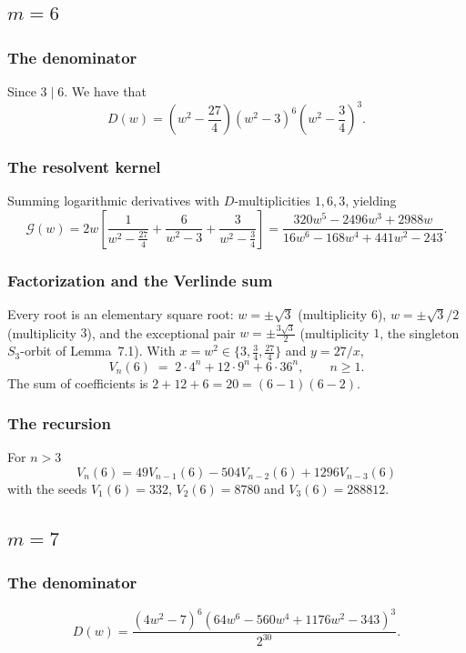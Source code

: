 \documentclass[11pt,reqno]{amsart}
\theoremstyle{remark}
\begin{document}
\subsection*{$m=6$}

\subsubsection*{The denominator}
Since $3\mid6$.  We have that
\[
D(w) = \left(w^2-\frac{27}{4}\right)(w^2-3)^6\left(w^2-\frac34\right)^{\!3}.
\]

\subsubsection*{The resolvent kernel}
Summing logarithmic derivatives with $D$-multiplicities $1,6,3$, yielding
\[
\mathcal G(w) = 2w\left[\frac{1}{w^2-\tfrac{27}{4}} + \frac{6}{w^2-3} + \frac{3}{w^2-\tfrac34}\right] = \frac{320w^5-2496w^3+2988w}{16w^6-168w^4+441w^2-243}.
\]

\subsubsection*{Factorization and the Verlinde sum}
Every root is an elementary square root: $w=\pm\sqrt3$ (multiplicity $6$), $w=\pm\sqrt3/2$ (multiplicity $3$), and the exceptional pair $w=\pm\tfrac{3\sqrt3}{2}$ (multiplicity $1$, the singleton $S_3$-orbit of Lemma~7.1). With $x=w^2\in\{3,\tfrac34,\tfrac{27}{4}\}$ and $y=27/x$,
\begin{equation*}
V_n(6) \;=\; 2\cdot4^n + 12\cdot9^n + 6\cdot36^n, \qquad n\ge1.
\end{equation*}
The sum of coefficients is $2 + 12 + 6  = 20 = (6-1)(6-2)$.

\subsubsection*{The recursion}
For $n>3$
$$
V_n(6) = 49 V_{n-1}(6) - 504 V_{n-2}(6)
+ 1296 V_{n-3}(6)
$$
with the seeds $V_1(6)=332$, $V_{2}(6) =8780$ and $V_{3}(6)=288812$.

\subsection*{$m=7$}

\subsubsection*{The denominator}
\[
D(w) = \frac{(4w^2-7)^6(64w^6-560w^4+1176w^2-343)^3}{2^{30}}.
\]
\end{document}
